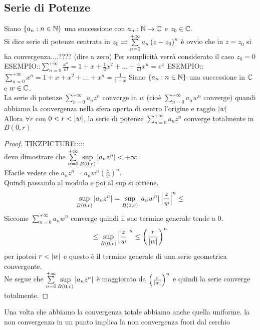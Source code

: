 \subsection{Serie di Potenze}
Siano $\left\{a_n:n\in\mathbb{N}\right\}$ una successione con $a_n:\mathbb{N}\to\mathbb{C}$ e $z_0\in\mathbb{C}$.\\
Si dice serie di potenze centrata in $z_0 \rightleftharpoons \sum\limits_{n=0}^{+\infty}a_n\left(z-z_0\right)^n$
\observation
è ovvio che in $z=z_0$ si ha convergenza....???? (dire a zero)
\observation
Per semplicità verrà considerato il caso $z_0=0$
ESEMPIO::$\sum\limits_{n=0}^{+\infty}\frac{x^n}{n!}=1+x+\frac{1}{2} x^2+\ldots+\frac{1}{n!}x^n=e^x$
ESEMPIO::$\sum\limits_{n=0}^{+\infty}x^n=1+x+x^2+\ldots+x^n=\frac{1}{1-x}$
\proposition
Siano $\left\{a_n:n\in\mathbb{N}\right\}$ una successione in $\mathbb{C}$ e $w\in\mathbb{C}$.\\
La serie di potenze $\sum\limits_{n=0}^{+\infty}a_nz^n$ converge in $w$ (cioè $\sum\limits_{n=0}^{+\infty}a_nw^n$ converge) quandi abbiamo la convergenza nella sfera aperta di centro l'origine e raggio $\left|w\right|$\\
Allora $\forall r$ con $0<r<\left|w\right|$, la serie di potenze $\sum\limits_{n=0}^{+\infty}a_nz^n$ converge totalmente in $B(0,r)$\\
\begin{proof}
	TIKZPICTURE:::::\\
	devo dimostrare che $\sum\limits_{n=0}^{+\infty}\sup\limits_{B(0,r)}\left|a_nz^n\right|<+\infty$.\\
	E\' facile vedere che $a_nz^n=a_nw^n\left(\frac{z}{w}\right)^n$.\\
	Quindi passando al modulo e poi al sup si ottiene.\\
	$$\sup\limits_{B(0,r)}\left|a_nz^n\right|=\sup\limits_{B(0,r)}\left|a_nw^n\right|\left|\frac{z}{w}\right|^n\le$$
	Siccome $\sum\limits_{n=0}^{+\infty}a_nw^n$ converge  quindi il suo termine generale tende a $0$.\\
	$$\le\sup\limits_{B(0,r)}\left|\frac{z}{w}\right|^n\le\left(\frac{r}{\left|w\right|}\right)^n $$
	per ipotesi $r<\left|w\right|$ e questo è il termine generale di una serie geometrica convergente.\\
	Ne segue che $\sum\limits_{n=0}^{+\infty}\sup\limits_{B(0,r)}\left|a_nz^n\right|$ è maggiorato da $\left( \frac{r}{\left|w\right|}\right)^n$ e quindi la serie converge totalmente.
\end{proof}
\observation
Una volta che abbiamo la convergenza totale abbiamo anche quella uniforme.
\proposition la non convergenza in un punto implica la non convergenza fuori dal cerchio\\
